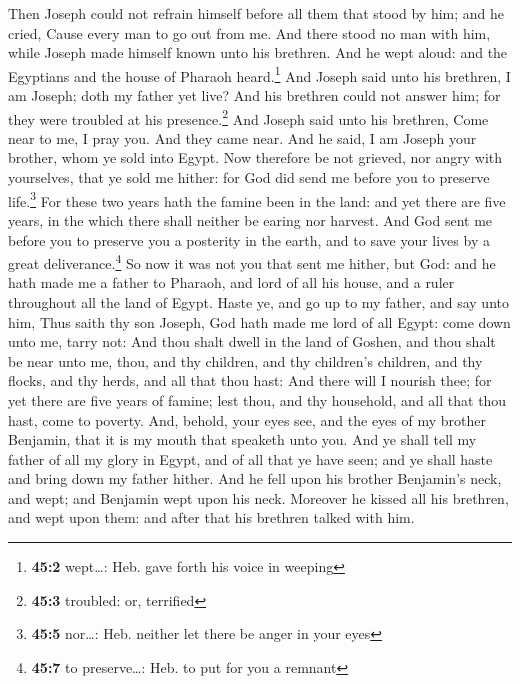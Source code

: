  Then Joseph could not refrain himself before all them
that stood by him; and he cried, Cause every man to go out from me. And
there stood no man with him, while Joseph made himself known unto his
brethren.  And he wept aloud: and the Egyptians and the
house of Pharaoh heard.\footnote{\textbf{45:2} wept\ldots: Heb. gave
  forth his voice in weeping}  And Joseph said unto his
brethren, I am Joseph; doth my father yet live? And his brethren could
not answer him; for they were troubled at his presence.\footnote{\textbf{45:3}
  troubled: or, terrified}  And Joseph said unto his
brethren, Come near to me, I pray you. And they came near. And he said,
I am Joseph your brother, whom ye sold into Egypt.  Now
therefore be not grieved, nor angry with yourselves, that ye sold me
hither: for God did send me before you to preserve life.\footnote{\textbf{45:5}
  nor\ldots: Heb. neither let there be anger in your eyes}
 For these two years hath the famine been in the land: and
yet there are five years, in the which there shall neither be earing nor
harvest.  And God sent me before you to preserve you a
posterity in the earth, and to save your lives by a great
deliverance.\footnote{\textbf{45:7} to preserve\ldots: Heb. to put for
  you a remnant}  So now it was not you that sent me
hither, but God: and he hath made me a father to Pharaoh, and lord of
all his house, and a ruler throughout all the land of Egypt.
 Haste ye, and go up to my father, and say unto him, Thus
saith thy son Joseph, God hath made me lord of all Egypt: come down unto
me, tarry not:  And thou shalt dwell in the land of
Goshen, and thou shalt be near unto me, thou, and thy children, and thy
children's children, and thy flocks, and thy herds, and all that thou
hast:  And there will I nourish thee; for yet there are
five years of famine; lest thou, and thy household, and all that thou
hast, come to poverty.  And, behold, your eyes see, and
the eyes of my brother Benjamin, that it is my mouth that speaketh unto
you.  And ye shall tell my father of all my glory in
Egypt, and of all that ye have seen; and ye shall haste and bring down
my father hither.  And he fell upon his brother
Benjamin's neck, and wept; and Benjamin wept upon his neck.
 Moreover he kissed all his brethren, and wept upon them:
and after that his brethren talked with him.

